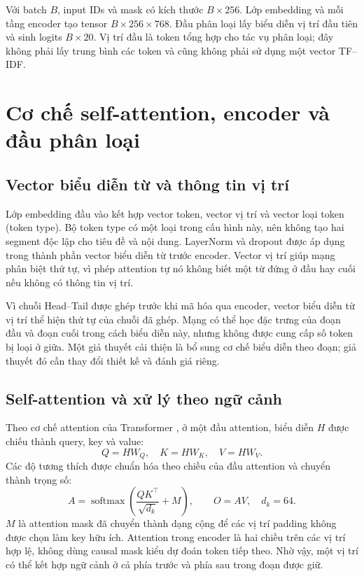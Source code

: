\EncoderDiagram
Với batch $B$, input IDs và mask có kích thước $B\times256$. Lớp embedding và mỗi tầng encoder tạo tensor $B\times256\times768$. Đầu phân loại lấy biểu diễn vị trí đầu tiên và sinh logits $B\times20$. Vị trí đầu là token tổng hợp cho tác vụ phân loại; đây không phải lấy trung bình các token và cũng không phải sử dụng một vector TF--IDF.

\FloatBarrier
\section{Cơ chế self-attention, encoder và đầu phân loại}\subsection{Vector biểu diễn từ và thông tin vị trí}
Lớp embedding đầu vào kết hợp vector token, vector vị trí và vector loại token (token type). Bộ token type có một loại trong cấu hình này, nên không tạo hai segment độc lập cho tiêu đề và nội dung. LayerNorm và dropout được áp dụng trong thành phần vector biểu diễn từ trước encoder. Vector vị trí giúp mạng phân biệt thứ tự, vì phép attention tự nó không biết một từ đứng ở đầu hay cuối nếu không có thông tin vị trí.

Vì chuỗi Head--Tail được ghép trước khi mã hóa qua encoder, vector biểu diễn từ vị trí thể hiện thứ tự của chuỗi đã ghép. Mạng có thể học đặc trưng của đoạn đầu và đoạn cuối trong cách biểu diễn này, nhưng không được cung cấp số token bị loại ở giữa. Một giả thuyết cải thiện là bổ sung cơ chế biểu diễn theo đoạn; giả thuyết đó cần thay đổi thiết kế và đánh giá riêng.

\subsection{Self-attention và xử lý theo ngữ cảnh}
Theo cơ chế attention của Transformer \citep{attention}, ở một đầu attention, biểu diễn $H$ được chiếu thành query, key và value:
\begin{equation}
Q=HW_Q,\quad K=HW_K,\quad V=HW_V.
\end{equation}
Các độ tương thích được chuẩn hóa theo chiều của đầu attention và chuyển thành trọng số:
\begin{equation}
A=\operatorname{softmax}\left(\frac{QK^\top}{\sqrt{d_k}}+M\right),\qquad O=AV,\quad d_k=64.
\end{equation}
$M$ là attention mask đã chuyển thành dạng cộng để các vị trí padding không được chọn làm key hữu ích. Attention trong encoder là hai chiều trên các vị trí hợp lệ, không dùng causal mask kiểu dự đoán token tiếp theo. Nhờ vậy, một vị trí có thể kết hợp ngữ cảnh ở cả phía trước và phía sau trong đoạn được giữ.

